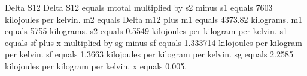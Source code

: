 Delta S12  
Delta S12 equals mtotal multiplied by s2 minus s1 equals 7603 kilojoules per kelvin.  
m2 equals Delta m12 plus m1 equals 4373.82 kilograms.  
m1 equals 5755 kilograms.  
s2 equals 0.5549 kilojoules per kilogram per kelvin.  
s1 equals sf plus x multiplied by sg minus sf equals 1.333714 kilojoules per kilogram per kelvin.  
sf equals 1.3663 kilojoules per kilogram per kelvin.  
sg equals 2.2585 kilojoules per kilogram per kelvin.  
x equals 0.005.